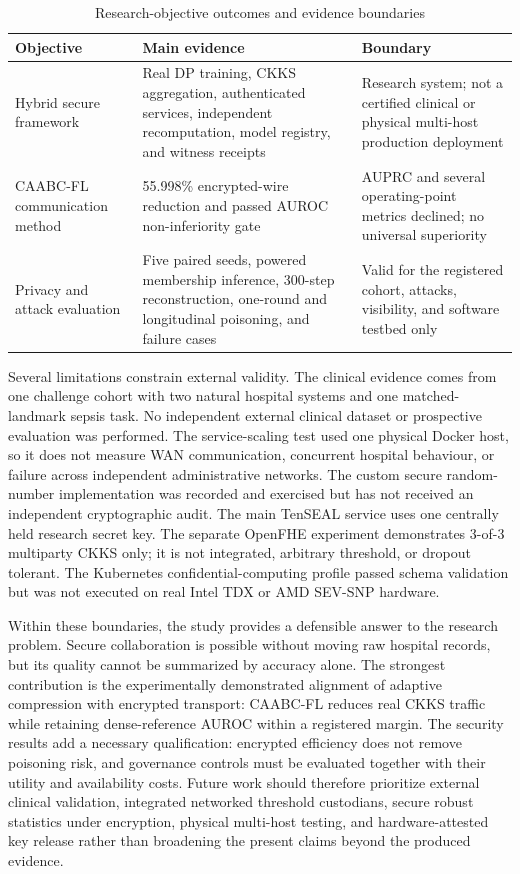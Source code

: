 \begin{table}[htbp]
    \centering
    \caption{Research-objective outcomes and evidence boundaries}
    \label{tab:objective-outcomes}
    \begin{tabularx}{\textwidth}{@{}p{}p{}X@{}}
        \toprule
        Objective & Main evidence & Boundary \\
        \midrule
        Hybrid secure framework & Real DP training, CKKS aggregation, authenticated services, independent recomputation, model registry, and witness receipts & Research system; not a certified clinical or physical multi-host production deployment \\
        CAABC-FL communication method & 55.998\% encrypted-wire reduction and passed AUROC non-inferiority gate & AUPRC and several operating-point metrics declined; no universal superiority \\
        Privacy and attack evaluation & Five paired seeds, powered membership inference, 300-step reconstruction, one-round and longitudinal poisoning, and failure cases & Valid for the registered cohort, attacks, visibility, and software testbed only \\
        \bottomrule
    \end{tabularx}
\end{table}

Several limitations constrain external validity. The clinical evidence comes from one challenge cohort with two natural hospital systems and one matched-landmark sepsis task. No independent external clinical dataset or prospective evaluation was performed. The service-scaling test used one physical Docker host, so it does not measure WAN communication, concurrent hospital behaviour, or failure across independent administrative networks. The custom secure random-number implementation was recorded and exercised but has not received an independent cryptographic audit. The main TenSEAL service uses one centrally held research secret key. The separate OpenFHE experiment demonstrates 3-of-3 multiparty CKKS only; it is not integrated, arbitrary threshold, or dropout tolerant. The Kubernetes confidential-computing profile passed schema validation but was not executed on real Intel TDX or AMD SEV-SNP hardware.

Within these boundaries, the study provides a defensible answer to the research problem. Secure collaboration is possible without moving raw hospital records, but its quality cannot be summarized by accuracy alone. The strongest contribution is the experimentally demonstrated alignment of adaptive compression with encrypted transport: CAABC-FL reduces real CKKS traffic while retaining dense-reference AUROC within a registered margin. The security results add a necessary qualification: encrypted efficiency does not remove poisoning risk, and governance controls must be evaluated together with their utility and availability costs. Future work should therefore prioritize external clinical validation, integrated networked threshold custodians, secure robust statistics under encryption, physical multi-host testing, and hardware-attested key release rather than broadening the present claims beyond the produced evidence.
